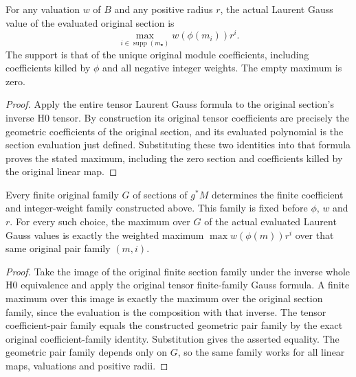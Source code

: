 \begin{theorem}\label{thm:fc-scheme-module-laurent-gauss-maximum}
\leanok
{}
For any valuation $w$ of $B$ and any positive radius $r$, the actual
Laurent Gauss value of the evaluated original section is
\[
 \max_{i\in\operatorname{supp}(m_\bullet)}w(\phi(m_i))r^i.
\]
The support is that of the unique original module coefficients,
including coefficients killed by $\phi$ and all negative integer
weights. The empty maximum is zero.
\end{theorem}
\begin{proof}
Apply the entire tensor Laurent Gauss formula to the original section's
inverse H0 tensor. By construction its original tensor coefficients
are precisely the geometric coefficients of the original section,
and its evaluated polynomial is the section evaluation just defined.
Substituting these two identities into that formula proves the stated
maximum, including the zero section and coefficients killed by the
original linear map.
\end{proof}

\begin{theorem}\label{thm:fc-scheme-module-laurent-gauss-finite-family}
\leanok
{}
Every finite original family $G$ of sections of $g^*M$ determines the
finite coefficient and integer-weight family constructed above.
This family is fixed before $\phi$, $w$ and $r$. For every such choice,
the maximum over $G$ of the actual evaluated Laurent Gauss values is
exactly the weighted maximum $\max w(\phi(m))r^i$ over that same
original pair family $(m,i)$.
\end{theorem}
\begin{proof}
Take the image of the original finite section family under the inverse
whole H0 equivalence and apply the original tensor finite-family Gauss
formula. A finite maximum over this image is exactly the maximum over
the original section family, since the evaluation is the composition
with that inverse. The tensor coefficient-pair family equals the
constructed geometric pair family by the exact original
coefficient-family identity. Substitution gives the asserted equality.
The geometric pair family depends only on $G$, so the same family
works for all linear maps, valuations and positive radii.
\end{proof}

